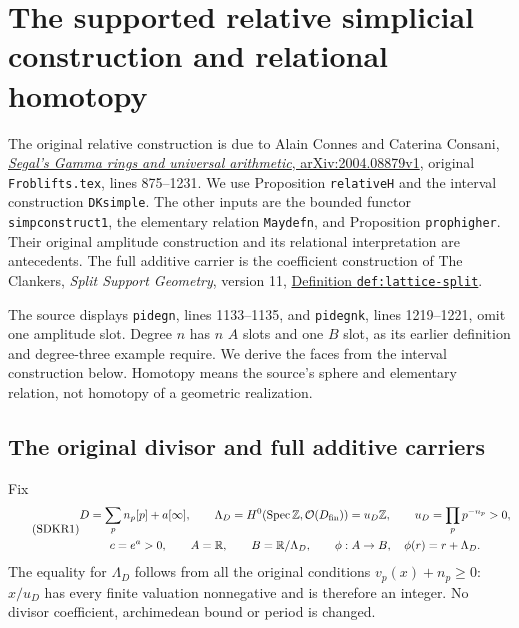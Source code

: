 \section{The supported relative simplicial construction and relational homotopy}
\label{sec:supported-dold-kan-independent}

The original relative construction is due to Alain Connes and
Caterina Consani,
\href{https://arxiv.org/abs/2004.08879v1}{\emph{Segal's Gamma rings
and universal arithmetic}, arXiv:2004.08879v1},
original \nolinkurl{Froblifts.tex}, lines 875--1231.
We use Proposition \texttt{relativeH} and the interval construction
\texttt{DKsimple}. The other inputs are the bounded functor
\texttt{simpconstruct1}, the elementary relation \texttt{Maydefn},
and Proposition \texttt{prophigher}. Their original amplitude construction and
its relational interpretation are antecedents. The full additive
carrier is the coefficient construction of The Clankers,
\emph{Split Support Geometry}, version 11,
\href{https://github.com/KokunoYumeto/zeta-function-research-reader/blob/a2851f9eb352e7e4376bc629de86fa4ed9c1c434/workbenches/splitzero-tandem/foundations/split-support-geometry-v11/split_support_geometry_arithmetic_curve_v11.tex#L1226}{Definition \texttt{def:lattice-split}}.

The source displays \texttt{pidegn}, lines 1133--1135, and
\texttt{pidegnk}, lines 1219--1221, omit one amplitude slot.
Degree $n$ has $n$ $A$ slots and one $B$ slot, as its earlier
definition and degree-three example require. We derive the faces
from the interval construction below. Homotopy means the source's
sphere and elementary relation, not homotopy of a geometric
realization.

\subsection{The original divisor and full additive carriers}

Fix
\begin{equation}\tag{SDKR1}
\begin{gathered}
D=\sum_p n_p[p]+a[\infty],\qquad
\Lambda_D=H^0(\operatorname{Spec}\mathbb Z,\mathcal O(D_{\rm fin}))
       =u_D\mathbb Z,\qquad u_D=\prod_p p^{-n_p}>0,\\
c=e^a>0,\qquad A=\mathbb R,\qquad B=\mathbb R/\Lambda_D,\qquad
\phi:A\to B,\quad \phi(r)=r+\Lambda_D.
\end{gathered}
\end{equation}
The equality for $\Lambda_D$ follows from all the original
conditions $v_p(x)+n_p\ge0$: $x/u_D$ has every finite valuation
nonnegative and is therefore an integer. No divisor coefficient,
archimedean bound or period is changed.


